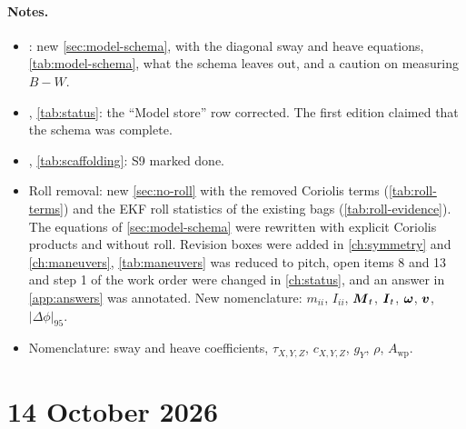 \paragraph{Notes.}
\begin{itemize}
  \item {}: new \cref{sec:model-schema}, with the diagonal sway and heave
        equations, \cref{tab:model-schema}, what the schema leaves out, and a caution on
        measuring $B - W$.
  \item {}, \cref{tab:status}: the ``Model store'' row corrected. The first
        edition claimed that the schema was complete.
  \item {}, \cref{tab:scaffolding}: S9 marked done.
  \item Roll removal: new \cref{sec:no-roll} with the removed Coriolis terms
        (\cref{tab:roll-terms}) and the EKF roll statistics of the existing bags
        (\cref{tab:roll-evidence}). The equations of \cref{sec:model-schema} were rewritten
        with explicit Coriolis products and without roll. Revision boxes were added in
        \cref{ch:symmetry} and \cref{ch:maneuvers}, \cref{tab:maneuvers} was reduced to pitch,
        open items 8 and 13 and step 1 of the work order were changed in \cref{ch:status}, and
        an answer in \cref{app:answers} was annotated. New nomenclature: $m_{ii}$, $I_{ii}$,
        $\boldsymbol{M}_t$, $\boldsymbol{I}_t$, $\boldsymbol{\omega}$, $\boldsymbol{v}$, $|\Delta\phi|_{95}$.
  \item Nomenclature: sway and heave coefficients, $\tau_{X,Y,Z}$, $c_{X,Y,Z}$, $g_Y$,
        $\rho$, $A_\mathrm{wp}$.
\end{itemize}

\section*{14 October 2026}

